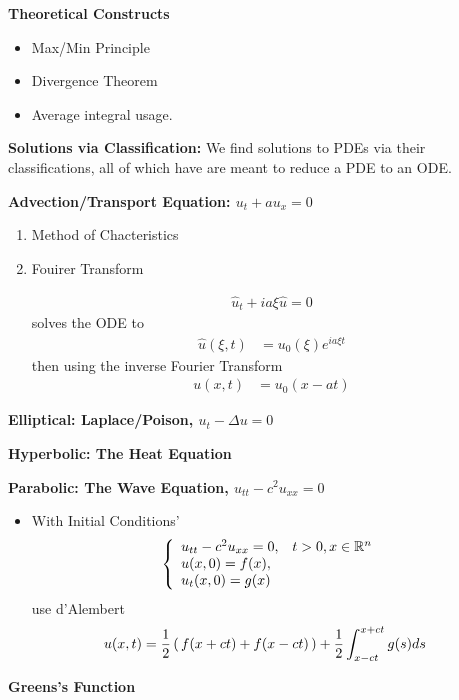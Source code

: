 \documentclass[12pt,a4paper]{report}
\begin{document}
{\begin{itemize}
\end{itemize}

\noindent\textbf{Theoretical Constructs}
\begin{itemize}
	\item Max/Min Principle
	\item Divergence Theorem
	\item Average integral usage.
\end{itemize}

\noindent\textbf{Solutions via Classification: }We find solutions to PDEs via their classifications, all of which have are meant to reduce a PDE to an ODE.

\begin{description}
	\item \textbf{Advection/Transport Equation: $u_t+au_x=0$}
	\begin{enumerate}
		\item Method of Chacteristics
		
		
		\item Fouirer Transform
		
		\begin{align*}
			\hat{u}_t + ia\xi\hat{u}=0
		\end{align*}solves the ODE to
		\begin{align*}
			\hat{u}(\xi,t)&= u_0(\xi)e^{ia\xi t}
		\end{align*}then using the inverse Fourier Transform
		\begin{align*}
			u(x,t) &= u_0(x-at)
		\end{align*}
	\end{enumerate}
	\item \textbf{Elliptical: Laplace/Poison, $u_t-\Delta u=0$}
	\item \textbf{Hyperbolic: The Heat Equation}
	\item \textbf{Parabolic: The Wave Equation, $u_{tt}-c^2u_{xx}=0$}
	\begin{itemize}
		\item With Initial Conditions'
		\begin{align*}
			\left \{ \begin{array}{ll} u_{tt}-c^2u_{xx}=0, & t>0, x\in \mathbb{R}^n\\ u(x,0) = f(x), \\ u_t(x,0) = g(x) \end{array} \right .
		\end{align*}use d'Alembert
		\begin{align*}
			u(x,t) &= \frac{1}{2}\left (\, f(x+ct)+f(x-ct) \,\right )+\frac{1}{2}\int_{x-ct}^{x+ct} g(s)ds
		\end{align*}
	\end{itemize}
\end{description}
\newpage
\textbf{\Large{Greens's Function}}

}
\end{document}
